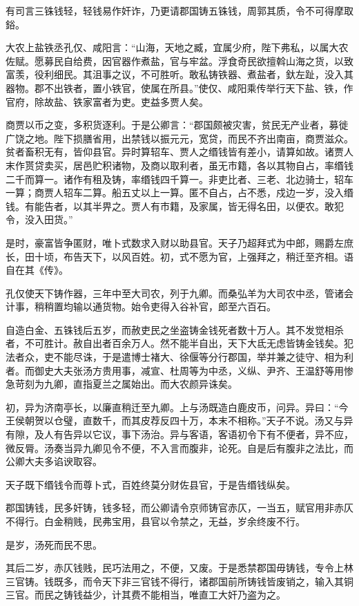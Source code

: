 \documentclass[]{article}
\begin{document}
有司言三铢钱轻，轻钱易作奸诈，乃更请郡国铸五铢钱，周郭其质，令不可得摩取鋊。

大农上盐铁丞孔仅、咸阳言：``山海，天地之臧，宜属少府，陛下弗私，以属大农佐赋。愿募民自给费，因官器作煮盐，官与牢盆。浮食奇民欲擅斡山海之货，以致富羡，役利细民。其沮事之议，不可胜听。敢私铸铁器、煮盐者，釱左趾，没入其器物。郡不出铁者，置小铁官，使属在所县。''使仅、咸阳乘传举行天下盐、铁，作官府，除故盐、铁家富者为吏。吏益多贾人矣。

商贾以币之变，多积货逐利。于是公卿言：``郡国颇被灾害，贫民无产业者，募徙广饶之地。陛下损膳省用，出禁钱以振元元，宽贷，而民不齐出南亩，商贾滋众。贫者畜积无有，皆仰县官。异时算轺车、贾人之缗钱皆有差小，请算如故。诸贾人末作贳贷卖买，居邑贮积诸物，及商以取利者，虽无市籍，各以其物自占，率缗钱二千而算一。诸作有租及铸，率缗钱四千算一。非吏比者、三老、北边骑士，轺车一算；商贾人轺车二算。船五丈以上一算。匿不自占，占不悉，戍边一岁，没入缗钱。有能告者，以其半畀之。贾人有市籍，及家属，皆无得名田，以便农。敢犯令，没入田货。''

是时，豪富皆争匿财，唯卜式数求入财以助县官。天子乃超拜式为中郎，赐爵左庶长，田十顷，布告天下，以风百姓。初，式不愿为官，上强拜之，稍迁至齐相。语自在其《传》。

孔仅使天下铸作器，三年中至大司农，列于九卿。而桑弘羊为大司农中丞，管诸会计事，稍稍置均输以通货物。始令吏得入谷补官，郎至六百石。

自造白金、五铢钱后五岁，而赦吏民之坐盗铸金钱死者数十万人。其不发觉相杀者，不可胜计。赦自出者百余万人。然不能半自出，天下大氐无虑皆铸金钱矣。犯法者众，吏不能尽诛，于是遣博士褚大、徐偃等分行郡国，举并兼之徒守、相为利者。而御史大夫张汤方贵用事，减宣、杜周等为中丞，义纵、尹齐、王温舒等用惨急苛刻为九卿，直指夏兰之属始出。而大农颜异诛矣。

初，异为济南亭长，以廉直稍迁至九卿。上与汤既造白鹿皮币，问异。异曰：``今王侯朝贺以仓璧，直数千，而其皮荐反四十万，本末不相称。''天子不说。汤又与异有隙，及人有告异以它议，事下汤治。异与客语，客语初令下有不便者，异不应，微反脣。汤奏当异九卿见令不便，不入言而腹非，论死。自是后有腹非之法比，而公卿大夫多谄谀取容。

天子既下缗钱令而尊卜式，百姓终莫分财佐县官，于是告缗钱纵矣。

郡国铸钱，民多奸铸，钱多轻，而公卿请令京师铸官赤仄，一当五，赋官用非赤仄不得行。白金稍贱，民弗宝用，县官以令禁之，无益，岁余终废不行。

是岁，汤死而民不思。

其后二岁，赤仄钱贱，民巧法用之，不便，又废。于是悉禁郡国毋铸钱，专令上林三官铸。钱既多，而令天下非三官钱不得行，诸郡国前所铸钱皆废销之，输入其铜三官。而民之铸钱益少，计其费不能相当，唯直工大奸乃盗为之。
\end{document}
